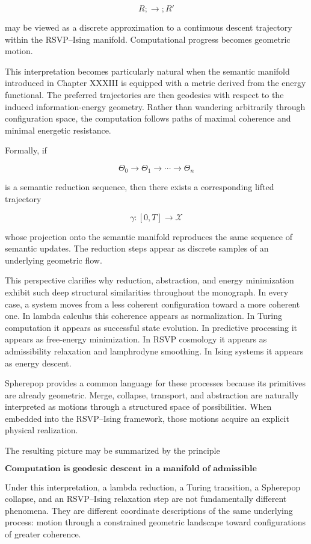 \documentclass[12pt,letterpaper]{article}
\theoremstyle{remark}
\begin{document}
\[
R ;\longrightarrow; R'
\]

may be viewed as a discrete approximation to a continuous descent trajectory within the RSVP--Ising manifold. Computational progress becomes geometric motion.

This interpretation becomes particularly natural when the semantic manifold introduced in Chapter XXXIII is equipped with a metric derived from the energy functional. The preferred trajectories are then geodesics with respect to the induced information-energy geometry. Rather than wandering arbitrarily through configuration space, the computation follows paths of maximal coherence and minimal energetic resistance.

Formally, if

\[
\Theta_0
\rightarrow
\Theta_1
\rightarrow
\cdots
\rightarrow
\Theta_n
\]

is a semantic reduction sequence, then there exists a corresponding lifted trajectory

\[
\gamma
:
[0,T]
\rightarrow
\mathcal{X}
\]

whose projection onto the semantic manifold reproduces the same sequence of semantic updates. The reduction steps appear as discrete samples of an underlying geometric flow.

This perspective clarifies why reduction, abstraction, and energy minimization exhibit such deep structural similarities throughout the monograph. In every case, a system moves from a less coherent configuration toward a more coherent one. In lambda calculus this coherence appears as normalization. In Turing computation it appears as successful state evolution. In predictive processing it appears as free-energy minimization. In RSVP cosmology it appears as admissibility relaxation and lamphrodyne smoothing. In Ising systems it appears as energy descent.

Spherepop provides a common language for these processes because its primitives are already geometric. Merge, collapse, transport, and abstraction are naturally interpreted as motions through a structured space of possibilities. When embedded into the RSVP--Ising framework, those motions acquire an explicit physical realization.

The resulting picture may be summarized by the principle

\[
\boxed{
\textbf{
Computation is geodesic descent in a manifold of admissible configurations.
}
}
\]

Under this interpretation, a lambda reduction, a Turing transition, a Spherepop collapse, and an RSVP--Ising relaxation step are not fundamentally different phenomena. They are different coordinate descriptions of the same underlying process: motion through a constrained geometric landscape toward configurations of greater coherence.
\end{document}
